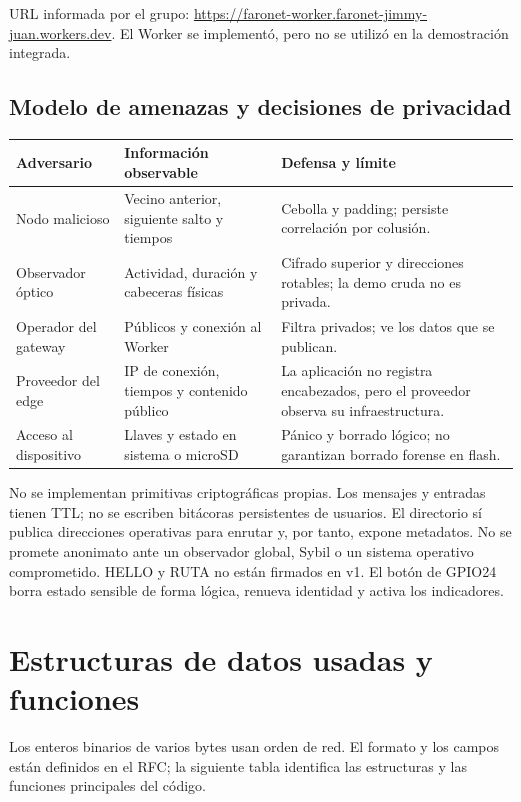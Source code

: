 \documentclass[11pt,letterpaper]{article}
\begin{document}
URL informada por el grupo:
\url{https://faronet-worker.faronet-jimmy-juan.workers.dev}.
El Worker se implementó, pero no se utilizó en la demostración integrada.

\subsection{Modelo de amenazas y decisiones de privacidad}

{\small
\begin{tabularx}{\linewidth}{P{2.8cm} X X}
\toprule
Adversario & Información observable & Defensa y límite\\
\midrule
Nodo malicioso & Vecino anterior, siguiente salto y tiempos & Cebolla y padding; persiste correlación por colusión.\\
Observador óptico & Actividad, duración y cabeceras físicas & Cifrado superior y direcciones rotables; la demo cruda no es privada.\\
Operador del gateway & Públicos y conexión al Worker & Filtra privados; ve los datos que se publican.\\
Proveedor del edge & IP de conexión, tiempos y contenido público & La aplicación no registra encabezados, pero el proveedor observa su infraestructura.\\
Acceso al dispositivo & Llaves y estado en sistema o microSD & Pánico y borrado lógico; no garantizan borrado forense en flash.\\
\bottomrule
\end{tabularx}}

No se implementan primitivas criptográficas propias. Los mensajes y entradas
tienen TTL; no se escriben bitácoras persistentes de usuarios. El directorio sí
publica direcciones operativas para enrutar y, por tanto, expone metadatos.
No se promete anonimato ante un observador global, Sybil o un sistema operativo
comprometido. HELLO y RUTA no están firmados en v1. El botón de GPIO24 borra
estado sensible de forma lógica, renueva identidad y activa los indicadores.

\section{Estructuras de datos usadas y funciones}

Los enteros binarios de varios bytes usan orden de red. El formato y los campos
están definidos en el RFC; la siguiente tabla identifica las estructuras y las
funciones principales del código.
\end{document}

